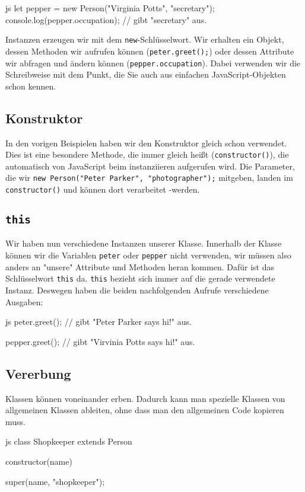 \documentclass[10pt,a4paper]{article}
\begin{document}
\begin{multicols}{3}
\begin{codebox}{js}{}
let pepper = new Person("Virginia Potts", "secretary");
console.log(pepper.occupation);
// gibt "secretary" aus.
\end{codebox}

Instanzen erzeugen wir mit dem \texttt{new}-Schlüsselwort. Wir erhalten ein Objekt, dessen Methoden wir aufrufen können (\texttt{peter.greet();}) oder dessen Attribute wir abfragen und ändern können (\texttt{pepper.occupation}). Dabei verwenden wir die Schreibweise mit dem Punkt, die Sie auch aus einfachen JavaScript-Objekten schon kennen.

\subsection*{Konstruktor}
In den vorigen Beispielen haben wir den Konstruktor gleich schon verwendet. Dies ist eine besondere Methode, die immer gleich heißt (\texttt{constructor()}), die automatisch von JavaScript beim instanziieren aufgerufen wird. Die Parameter, die wir \texttt{new Person("Peter Parker", "photographer");} mitgeben, landen im \texttt{constructor()} und können dort verarbeitet -werden.

\subsection*{\texttt{this}}
Wir haben nun verschiedene Instanzen unserer Klasse. Innerhalb der Klasse können wir die Variablen \texttt{peter} oder \texttt{pepper} nicht verwenden, wir müssen also anders an "unsere" Attribute und Methoden heran kommen. Dafür ist das Schlüsselwort \texttt{this} da. \texttt{this} bezieht sich immer auf die gerade verwendete Instanz. Deswegen haben die beiden nachfolgenden Aufrufe verschiedene Ausgaben:

\begin{codebox}{js}{}
peter.greet();
// gibt "Peter Parker says hi!" aus.

pepper.greet();
// gibt "Virvinia Potts says hi!" aus.
\end{codebox}


\subsection*{Vererbung}
Klassen können voneinander erben. Dadurch kann man spezielle Klassen von allgemeinen Klassen ableiten, ohne dass man den allgemeinen Code kopieren muss.

\begin{codebox}{js}{}
class Shopkeeper extends Person {
  constructor(name) {
    super(name, "shopkeeper");

}}
\end{codebox}
\end{multicols}
\end{document}
